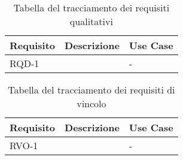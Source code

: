 \begin{table}%
\caption{Tabella del tracciamento dei requisiti qualitativi}
\label{tab:requisiti-qualitativi}
\begin{tabularx}{\textwidth}{lXl}
\hline\hline
\textbf{Requisito} & \textbf{Descrizione} & \textbf{Use Case}\\
\hline
RQD-1    &  & - \\
\hline
\end{tabularx}
\end{table}%

\begin{table}%
\caption{Tabella del tracciamento dei requisiti di vincolo}
\label{tab:requisiti-vincolo}
\begin{tabularx}{\textwidth}{lXl}
\hline\hline
\textbf{Requisito} & \textbf{Descrizione} & \textbf{Use Case}\\
\hline
RVO-1    &  & - \\
\hline
\end{tabularx}
\end{table}%